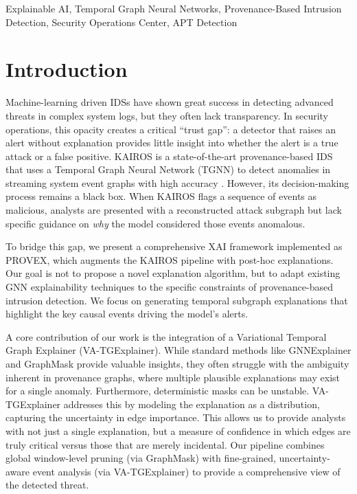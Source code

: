 \documentclass[conference]{IEEEtran}
\begin{document}
\begin{IEEEkeywords}
Explainable AI, Temporal Graph Neural Networks, Provenance-Based Intrusion Detection, Security Operations Center, APT Detection
\end{IEEEkeywords}

\section{Introduction}


Machine-learning driven IDSs have shown great success in detecting advanced threats in complex system logs, but they often lack transparency. In security operations, this opacity creates a critical ``trust gap'': a detector that raises an alert without explanation provides little insight into whether the alert is a true attack or a false positive. KAIROS is a state-of-the-art provenance-based IDS that uses a Temporal Graph Neural Network (TGNN) to detect anomalies in streaming system event graphs with high accuracy \cite{b5}. However, its decision-making process remains a black box. When KAIROS flags a sequence of events as malicious, analysts are presented with a reconstructed attack subgraph but lack specific guidance on \textit{why} the model considered those events anomalous.

To bridge this gap, we present a comprehensive XAI framework implemented as PROVEX, which augments the KAIROS pipeline with post-hoc explanations. Our goal is not to propose a novel explanation algorithm, but to adapt existing GNN explainability techniques to the specific constraints of provenance-based intrusion detection. We focus on generating temporal subgraph explanations that highlight the key causal events driving the model's alerts.

A core contribution of our work is the integration of a Variational Temporal Graph Explainer (VA-TGExplainer). While standard methods like GNNExplainer \cite{b6} and GraphMask \cite{b7} provide valuable insights, they often struggle with the ambiguity inherent in provenance graphs, where multiple plausible explanations may exist for a single anomaly. Furthermore, deterministic masks can be unstable. VA-TGExplainer addresses this by modeling the explanation as a distribution, capturing the uncertainty in edge importance. This allows us to provide analysts with not just a single explanation, but a measure of confidence in which edges are truly critical versus those that are merely incidental. Our pipeline combines global window-level pruning (via GraphMask) with fine-grained, uncertainty-aware event analysis (via VA-TGExplainer) to provide a comprehensive view of the detected threat.
\end{document}
